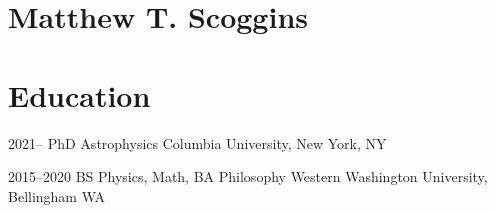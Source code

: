\documentclass[]{scoggins-cv} %
\def\faEnvelope{{\FA\symbol{"F0E0}}}
\def\faGithub{{\FA\symbol{"F09B}}}
\def\faPhone{{\FA\symbol{"F095}}}
\def\faHandPointerO{{\FA\symbol{"F25A}}}
\def\faMapMarker{{\FA\symbol{"F041}}}
\begin{document}
\section{Matthew T. Scoggins}
\vspace{-0.5cm}
\section{Education}
\vspace{-0.3cm}

\begin{entrylist}


	\vspace{-0.3cm}
    \entry
    {2021--}
    {PhD {\normalfont Astrophysics}}
    {Columbia University, New York, NY}
	{}



    \entry
    {2015--2020}
    {BS {\normalfont Physics, Math,} BA {\normalfont Philosophy}}
    {Western Washington University, Bellingham WA}
	{}
\iffalse
    \entry
    {2013-2015}
    {AS}
    {Whatcom Community College, Bellingham WA}
\fi

\end{entrylist}
\end{document}
